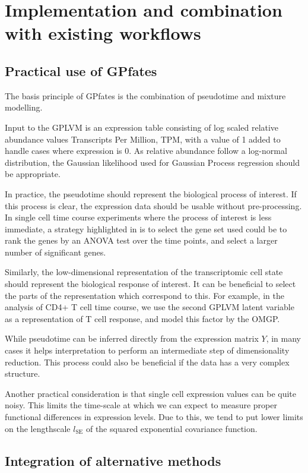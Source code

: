 \section{Implementation and combination with existing workflows}

\subsection{Practical use of GPfates}

The basis principle of GPfates is the combination of pseudotime and mixture modelling.

Input to the GPLVM is an expression table consisting of log scaled relative abundance values Transcripts Per Million, TPM, with a value of 1 added to handle cases where expression is 0. As relative abundance follow a log-normal distribution, the Gaussian likelihood used for Gaussian Process regression should be appropriate.

In practice, the pseudotime should represent the biological process of interest. If this process is clear, the expression data should be usable without pre-processing. In single cell time course experiments where the process of interest is less immediate, a strategy highlighted in \cite{Trapnell2014-cn} is to select the gene set used could be to rank the genes by an ANOVA test over the time points, and select a larger number of significant genes.

Similarly, the low-dimensional representation of the transcriptomic cell state should represent the biological response of interest. It can be beneficial to select the parts of the representation which correspond to this. For example, in the analysis of CD4+ T cell time course, we use the second GPLVM latent variable as a representation of T cell response, and model this factor by the OMGP.

While pseudotime can be inferred directly from the expression matrix $ Y $, in many cases it helps interpretation to perform an intermediate step of dimensionality reduction. This process could also be beneficial if the data has a very complex structure.

Another practical consideration is that single cell expression values can be quite noisy. This limits the time-scale at which we can expect to measure proper functional differences in expression levels. Due to this, we tend to put lower limits on the lengthscale $ l_\text{SE} $ of the squared exponential covariance function.

\subsection{Integration of alternative methods}

